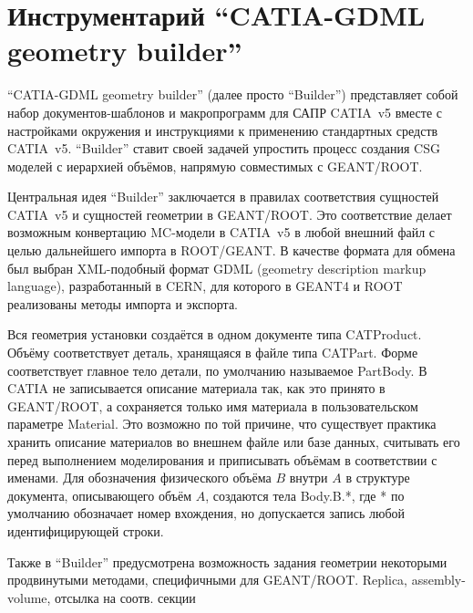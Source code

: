 \section{Инструментарий ``CATIA-GDML geometry builder''}\label{sec:secBuilder}

``CATIA-GDML geometry builder'' (далее просто ``Builder'') представляет собой набор документов-шаблонов и макропрограмм для САПР CATIA~v5 вместе с настройками окружения и инструкциями к применению стандартных средств CATIA~v5. ``Builder'' ставит своей задачей упростить процесс создания CSG моделей с иерархией объёмов, напрямую совместимых с GEANT/ROOT.

Центральная идея ``Builder'' заключается в правилах соответствия сущностей CATIA~v5 и сущностей геометрии в GEANT/ROOT. Это соответствие делает возможным конвертацию MC-модели в CATIA~v5 в любой внешний файл с целью дальнейшего импорта в ROOT/GEANT. В качестве формата для обмена был выбран XML-подобный формат GDML (geometry description markup language), разработанный в CERN, для которого в GEANT4 и ROOT реализованы методы импорта и экспорта.

Вся геометрия установки создаётся в одном документе типа CATProduct. Объёму соответствует деталь, хранящаяся в файле типа CATPart. Форме соответствует главное тело детали, по умолчанию называемое PartBody. В CATIA не записывается описание материала так, как это принято в GEANT/ROOT, а сохраняется только имя материала в пользовательском параметре Material. Это возможно по той причине, что существует практика хранить описание материалов во внешнем файле или базе данных, считывать его перед выполнением моделирования и приписывать объёмам в соответствии с именами. Для обозначения физического объёма $B$ внутри $A$ в структуре документа, описывающего объём $A$, создаются тела Body.B.*, где * по умолчанию обозначает номер вхождения, но допускается запись любой идентифицирующей строки.

Также в ``Builder'' предусмотрена возможность задания геометрии некоторыми продвинутыми методами, специфичными для GEANT/ROOT. \todo Replica, assembly-volume, отсылка на соотв. секции

